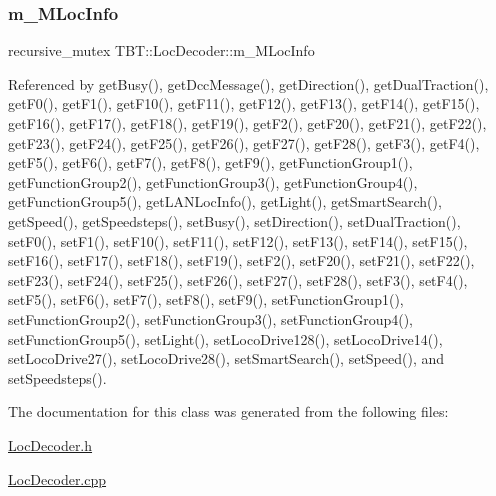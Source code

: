 \subsubsection{\texorpdfstring{m\+\_\+\+M\+Loc\+Info}{m\_MLocInfo}}
{\footnotesize\ttfamily recursive\+\_\+mutex T\+B\+T\+::\+Loc\+Decoder\+::m\+\_\+\+M\+Loc\+Info\hspace{0.3cm}{\ttfamily [private]}}



Referenced by get\+Busy(), get\+Dcc\+Message(), get\+Direction(), get\+Dual\+Traction(), get\+F0(), get\+F1(), get\+F10(), get\+F11(), get\+F12(), get\+F13(), get\+F14(), get\+F15(), get\+F16(), get\+F17(), get\+F18(), get\+F19(), get\+F2(), get\+F20(), get\+F21(), get\+F22(), get\+F23(), get\+F24(), get\+F25(), get\+F26(), get\+F27(), get\+F28(), get\+F3(), get\+F4(), get\+F5(), get\+F6(), get\+F7(), get\+F8(), get\+F9(), get\+Function\+Group1(), get\+Function\+Group2(), get\+Function\+Group3(), get\+Function\+Group4(), get\+Function\+Group5(), get\+L\+A\+N\+Loc\+Info(), get\+Light(), get\+Smart\+Search(), get\+Speed(), get\+Speedsteps(), set\+Busy(), set\+Direction(), set\+Dual\+Traction(), set\+F0(), set\+F1(), set\+F10(), set\+F11(), set\+F12(), set\+F13(), set\+F14(), set\+F15(), set\+F16(), set\+F17(), set\+F18(), set\+F19(), set\+F2(), set\+F20(), set\+F21(), set\+F22(), set\+F23(), set\+F24(), set\+F25(), set\+F26(), set\+F27(), set\+F28(), set\+F3(), set\+F4(), set\+F5(), set\+F6(), set\+F7(), set\+F8(), set\+F9(), set\+Function\+Group1(), set\+Function\+Group2(), set\+Function\+Group3(), set\+Function\+Group4(), set\+Function\+Group5(), set\+Light(), set\+Loco\+Drive128(), set\+Loco\+Drive14(), set\+Loco\+Drive27(), set\+Loco\+Drive28(), set\+Smart\+Search(), set\+Speed(), and set\+Speedsteps().



The documentation for this class was generated from the following files\+:\begin{DoxyCompactItemize}
\item 
\hyperlink{LocDecoder_8h}{Loc\+Decoder.\+h}\item 
\hyperlink{LocDecoder_8cpp}{Loc\+Decoder.\+cpp}\end{DoxyCompactItemize}
